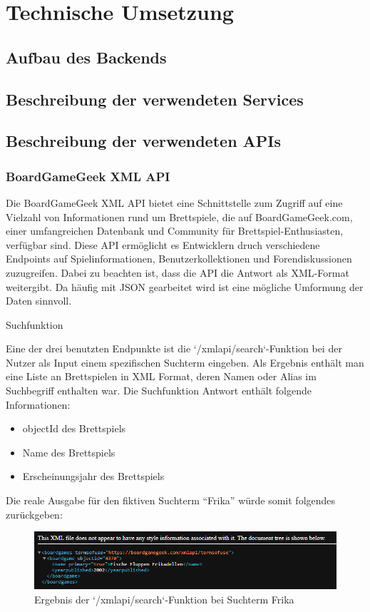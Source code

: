 \chapter{Technische Umsetzung}
\section{Aufbau des Backends}
\section{Beschreibung der verwendeten Services}


\section{Beschreibung der verwendeten APIs}
\subsection{BoardGameGeek XML API }

Die BoardGameGeek XML API bietet eine Schnittstelle zum Zugriff auf eine Vielzahl von Informationen rund um Brettspiele,
die auf BoardGameGeek.com, einer umfangreichen Datenbank und Community für Brettspiel-Enthusiasten,
verfügbar sind. Diese API ermöglicht es Entwicklern druch verschiedene Endpoints auf Spielinformationen,
Benutzerkollektionen und Forendiskussionen zuzugreifen. Dabei zu beachten ist, dass die API die Antwort als XML-Format weitergibt. 
Da häufig mit JSON gearbeitet wird ist eine mögliche Umformung der Daten sinnvoll.

\large Suchfunktion

Eine der drei benutzten Endpunkte ist die `/xmlapi/search`-Funktion bei der Nutzer als Input einem spezifischen Suchterm eingeben.
Als Ergebnis enthält man eine Liste an Brettspielen in XML Format, deren Namen oder Alias im Suchbegriff enthalten war.
Die Suchfunktion Antwort enthält folgende Informationen:
\begin{itemize}
    \item {objectId des Brettspiels}
    \item {Name des Brettspiels}
    \item {Erscheinungsjahr des Brettspiels}
\end{itemize}

Die reale Ausgabe für den fiktiven Suchterm ``Frika'' würde somit folgendes zurückgeben: 
\begin{figure}[h]
    \centering
    \includegraphics[width=1\textwidth]{graphics/Search_API.png}
    \caption{Ergebnis der `/xmlapi/search`-Funktion bei Suchterm Frika}
    \label{fig:Search_API}
\end{figure}

